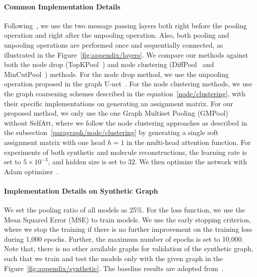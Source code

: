 \paragraph{Common Implementation Details}
Following~\citet{MincutPool}, we use the two message passing layers both right before the pooling operation and right after the unpooling operation. Also, both pooling and unpooling operations are performed once and sequentially connected, as illustrated in the Figure~\ref{fig:appendix/layers}. We compare our methods against both the node drop (TopKPool~\citep{TopKPool}) and node clustering (DiffPool~\citep{DiffPool} and MinCutPool~\citep{MincutPool}) methods. For the node drop method, we use the unpooling operation proposed in the graph U-net~\citep{TopKPool}. For the node clustering methods, we use the graph coarsening schemes described in the equation~\ref{node/clustering}, with their specific implementations on generating an assignment matrix. For our proposed method, we only use the one Graph Multiset Pooling (GMPool) without SelfAtt, where we follow the node clustering approaches as described in the subsection~\ref{paragraph/node/clustering} by generating a single soft assignment matrix with one head $h=1$ in the multi-head attention function. For experiments of both synthetic and molecule reconstructions, the learning rate is set to $5\times10^{-3}$, and hidden size is set to $32$. We then optimize the network with Adam optimizer~\citep{kingma2014adam}.


\paragraph{Implementation Details on Synthetic Graph}
We set the pooling ratio of all models as 25\%. For the loss function, we use the Mean Squared Error (MSE) to train models. We use the early stopping criterion, where we stop the training if there is no further improvement on the training loss during 1,000 epochs. Further, the maximum number of epochs is set to 10,000. Note that, there is no other available graphs for validation of the synthetic graph, such that we train and test the models only with the given graph in the Figure~\ref{fig:appendix/synthetic}. The baseline results are adopted from~\citet{MincutPool}.


